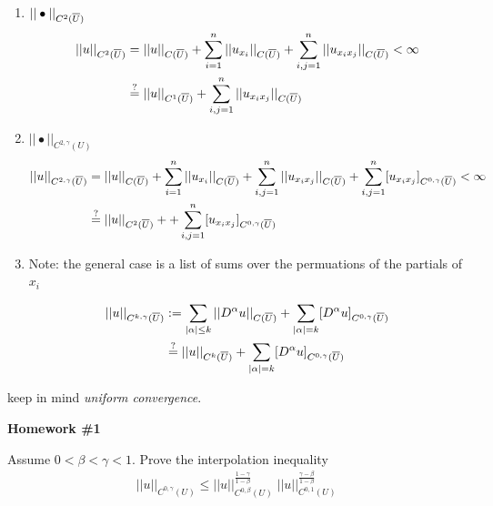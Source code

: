 \documentclass[12pt,a4paper]{report}
\newcommand{\CSPACE}{{C(\CONJ{U})}}
\newcommand{\CNORM}[1]{|| #1 ||_\CSPACE}
\newcommand{\CSUBSPACE}[3]{C^{#1,#2}(#3)}
\newcommand{\HSPACE}[3]{C^{#1,#2}(#3)}
\newcommand{\HOLDERNORM}[4]{|| #4 ||_{\HSPACE{#1}{#2}{#3}}}
\newcommand{\HSEMINORM}[4]{[ #4 ]_{\HSPACE{#1}{#2}{#3}}}
\begin{document}
\begin{description}
\begin{enumerate}
		
		\item $|| \bullet ||_{C^{2}(\overline{U})}$
		\begin{align*}
			\CCCNORM{2}{\CONJ{U}}{u} &= \CNORM{u} + \sum_{i=1}^n \CNORM{u_{x_i}}+ \sum_{i,j=1}^n  \CNORM{u_{x_ix_j}} < \infty \\
			&\overset{?}{=} \CCCNORM{1}{\CONJ{U}}{u} + \sum_{i,j=1}^n  \CNORM{u_{x_ix_j}}
		\end{align*}
		
		\item $\HOLDERNORM{2}{\gamma}{U}{\bullet}$
		\begin{align*}
			\HOLDERNORM{2}{\gamma}{\CONJ{U}}{u} &= \CNORM{u} + \sum_{i=1}^n \CNORM{u_{x_i}}+ \sum_{i,j=1}^n  \CNORM{u_{x_ix_j}}+ \sum_{i,j=1}^n  \HSEMINORM{0}{\gamma}{\CONJ{U}}{u_{x_ix_j}} < \infty \\
			&\overset{?}{=} \CCCNORM{2}{\CONJ{U}}{u} + + \sum_{i,j=1}^n  \HSEMINORM{0}{\gamma}{\CONJ{U}}{u_{x_ix_j}}
		\end{align*}
		
		\item Note: the general case is a list of sums over the permuations of the partials of $x_i$
		
		\begin{align*}
			\HOLDERNORM{k}{\gamma}{\CONJ{U}}{u} &:= \sum_{|\alpha|\le k} \CNORM{D^\alpha u}+\sum_{|\alpha|=k} \HSEMINORM{0}{\gamma}{\CONJ{U}}{D^\alpha u} \\
			&\overset{?}{=} \CCCNORM{k}{\CONJ{U}}{u} + \sum_{|\alpha|=k} \HSEMINORM{0}{\gamma}{\CONJ{U}}{D^\alpha u} \\
		\end{align*}
	\end{enumerate}
	
	\item keep in mind \textit{uniform convergence}.
\end{description}

\HLINE
\textbf{\large{Homework \#1}}

Assume $0 < \beta < \gamma < 1$.  Prove the interpolation inequality 
\begin{align*}
	\HOLDERNORM{0}{\gamma}{U}{u} \le \HOLDERNORM{0}{\beta}{U}{u}^{\frac{1-\gamma}{1-\beta}}\;\HOLDERNORM{0}{1}{U}{u}^{\frac{\gamma-\beta}{1-\beta}}
\end{align*}
\end{document}
